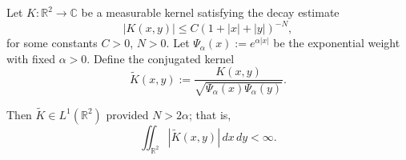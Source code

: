 \begin{lemma}
\label{lem:L1-integrability-conjugated-kernel}
Let \( K \colon \mathbb{R}^2 \to \mathbb{C} \) be a measurable kernel satisfying the decay estimate
\[
|K(x,y)| \le C (1 + |x| + |y|)^{-N},
\]
for some constants \( C > 0 \), \( N > 0 \). Let \( \Psi_\alpha(x) := e^{\alpha |x|} \) be the exponential weight with fixed \( \alpha > 0 \). Define the conjugated kernel
\[
\widetilde{K}(x,y) := \frac{K(x,y)}{\sqrt{\Psi_\alpha(x)\Psi_\alpha(y)}}.
\]

Then \( \widetilde{K} \in L^1(\mathbb{R}^2) \) provided \( N > 2\alpha \); that is,
\[
\iint_{\mathbb{R}^2} |\widetilde{K}(x,y)|\, dx\,dy < \infty.
\]
\end{lemma}
